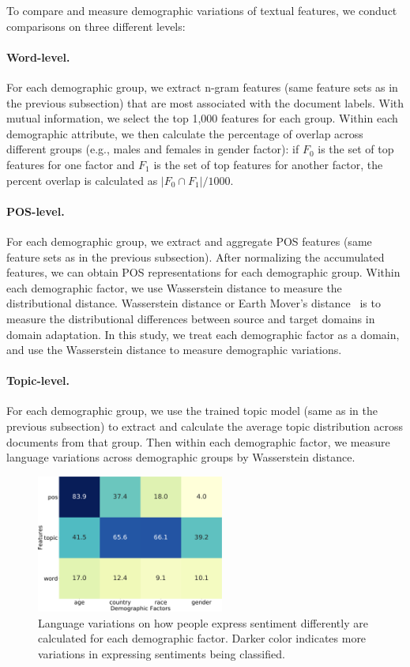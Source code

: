 To compare and measure demographic variations of textual features, we conduct comparisons on three different levels:

\paragraph{Word-level.} For each demographic group, we extract n-gram features (same feature sets as in the previous subsection) that are most associated with the document labels. With mutual information, we select the top 1,000 features for each group. Within each demographic attribute, we then calculate the percentage of overlap across different groups (e.g., males and females in gender factor): if $F_0$ is the set of top features for one factor and $F_1$ is the set of top features for another factor, the percent overlap is calculated as $|F_0 \cap F_1|/1000$.

\paragraph{POS-level.} For each demographic group, we extract and aggregate POS features (same feature sets as in the previous subsection). After normalizing the accumulated features, we can obtain POS representations for each demographic group. Within each demographic factor, we use Wasserstein distance to measure the distributional distance. Wasserstein distance or Earth Mover's distance~\cite{vallender1974calculation} is to measure the distributional differences between source and target domains in domain adaptation. In this study, we treat each demographic factor as a domain, and use the Wasserstein distance to measure demographic variations.

\paragraph{Topic-level.} For each demographic group, we use the trained topic model (same as in the previous subsection) to extract and calculate the average topic distribution across documents from that group. Then within each demographic factor, we measure language variations across demographic groups by Wasserstein distance. 

\begin{figure}[htp]
\centering
\includegraphics[width=0.55\textwidth]{images/chapter5/overlaps.pdf}
\caption{Language variations on how people express sentiment differently are calculated for each demographic factor. Darker color indicates more variations in expressing sentiments being classified.}
\label{chap5:fig:overlaps}
\end{figure}


